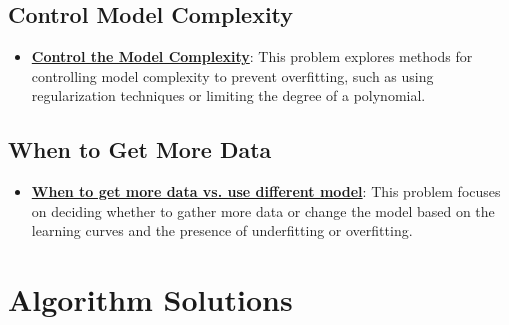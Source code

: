 \documentclass{article}%
\begin{document}
%
\subsection{Control Model Complexity}%
\label{subsec:ControlModelComplexity}%
\begin{itemize}[leftmargin=*]%
\item \href{https://purdue.brightspace.com/d2l/common/assets/pdfjs-d2l-dist/1.0.14-legacy/web/viewer.html?file=\%2Fcontent\%2Fenforced\%2F1095467-wl.202510.CS.24300.001\%2F10L1-CrossValidation.pdf\%3Fou\%3D1095467\&lang=en-us\&container=d2l-fileviewer-rendered-pdf\&fullscreen=d2l-fileviewer-rendered-pdf-dialog\&height=667#page=16}{\textbf{Control the Model Complexity}}: This problem explores methods for controlling model complexity to prevent overfitting, such as using regularization techniques or limiting the degree of a polynomial.%
\end{itemize}

%
\subsection{When to Get More Data}%
\label{subsec:WhentoGetMoreData}%
\begin{itemize}[leftmargin=*]%
\item \href{https://purdue.brightspace.com/d2l/common/assets/pdfjs-d2l-dist/1.0.14-legacy/web/viewer.html?file=\%2Fcontent\%2Fenforced\%2F1095467-wl.202510.CS.24300.001\%2F10L1-CrossValidation.pdf\%3Fou\%3D1095467\&lang=en-us\&container=d2l-fileviewer-rendered-pdf\&fullscreen=d2l-fileviewer-rendered-pdf-dialog\&height=667#page=21}{\textbf{When to get more data vs. use different model}}: This problem focuses on deciding whether to gather more data or change the model based on the learning curves and the presence of underfitting or overfitting.%
\end{itemize}

%
\section{Algorithm Solutions}%
\label{sec:AlgorithmSolutions}%
\end{document}
